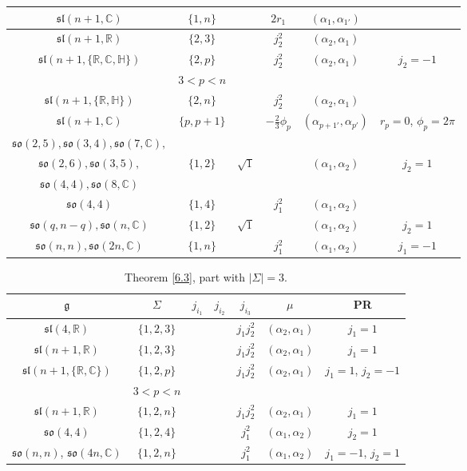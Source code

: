 \documentclass[pdftex]{sigma}
\newcommand{\Si}{\Sigma}
\newcommand{\fg}{\mathfrak g}
\newcommand{\R}{\mathbb{R}}
\newcommand{\C}{\mathbb{C}}
\numberwithin{equation}{section}
\begin{document}
\begin{table}[th!]
\begin{tabular}{|c|c|c|c|c|c|}
\hline
$\mathfrak{sl}(n+1,\mathbb{C})$ &$\{1,n\}$&& $2r_1$& $(\alpha_{1},\alpha_{1'})$& \\
\hline
$\mathfrak{sl}(n+1,\R)$ & $\{2,3\}$ &&$j_2^2$ & $(\alpha_2,\alpha_1)$ &\\
\hline
$\mathfrak{sl}(n+1,\{\R,\C,\mathbb{H}\})$ & $\{2,p\}$ &&$j_2^2$ & $(\alpha_2,\alpha_1)$ & $j_2=-1$\\
& $3<p<n$& & &&\\
\hline
$\mathfrak{sl}(n+1,\{\R,\mathbb{H}\})$ & $\{2,n\}$ &&$j_2^2$ & $(\alpha_2,\alpha_1)$ & \\
\hline
$\mathfrak{sl}(n+1,\mathbb{C})$& $\{p,p+1\}$ && $-\frac23\phi_p$& $ (\alpha_{p+1'},\alpha_{p'})$& $r_p=0$, $\phi_p=2\pi$ \\

\hline
$\mathfrak{so}(2,5),\mathfrak{so}(3,4),\mathfrak{so}(7,\C),$&&&& & \\
$\mathfrak{so}(2,6),\mathfrak{so}(3,5),$&$\{ 1,2\}$&$\sqrt{1} $&& $(\alpha_1,\alpha_2)$ &$j_2=1$ \\
$\mathfrak{so}(4,4),\mathfrak{so}(8,\C)$& & & & &\\
\hline
$\mathfrak{so}(4,4)$&$\{ 1,4\}$& & $j_1^2$& $(\alpha_1,\alpha_2)$ & \\
\hline
$\mathfrak{so}(q,n-q),\mathfrak{so}(n,\C)$&$\{ 1,2\}$&$\sqrt{1} $&& $(\alpha_1,\alpha_2)$ &$j_2=1$ \\
\hline
$\mathfrak{so}(n,n), \mathfrak{so}(2n,\C)$&$\{ 1,n\}$& & $j_1^2$& $(\alpha_1,\alpha_2)$ &$j_1=-1$ \\
\hline
\end{tabular}
\end{table}

\begin{table}[th!]\centering \caption{Theorem \ref{6.3}, part with $|\Si|=3$.}\label{ahs3}\vspace{1mm}

\begin{tabular}{|c|c|c|c|c|c|c|}
\hline
$\fg$ & $\Sigma$ & $j_{i_1}$& $j_{i_2}$& $j_{i_3}$&$\mu$&PR \\
\hline
\hline
$\mathfrak{sl}(4,\mathbb{R})$ &$\{1,2,3\}$& & & $j_1j_2^2 $ &$(\alpha_2,\alpha_1)$& $j_1=1$\\
\hline
$\mathfrak{sl}(n+1,\mathbb{R})$ &$\{1,2,3\}$& & & $j_1j_2^2 $ &$(\alpha_2,\alpha_1)$& $j_1=1$ \\
\hline
$\mathfrak{sl}(n+1,\{\mathbb{R},\C\})$ &$\{1,2,p\}$& & & $j_1j_2^2 $ &$(\alpha_2,\alpha_1)$& $j_1=1$, $j_2=-1$ \\
& $3<p<n$& & &&&\\
\hline
$\mathfrak{sl}(n+1,\mathbb{R})$ &$\{1,2,n\}$& & & $j_1j_2^2 $ &$(\alpha_2,\alpha_1)$& $j_1=1$ \\
\hline
$\mathfrak{so}(4,4)$& $\{1,2,4\}$&&& $j_1^2 $&$(\alpha_1,\alpha_2)$& $j_2=1$\\
\hline
$\mathfrak{so}(n,n)$, $\mathfrak{so}(4n,\mathbb{C})$& $\{1,2,n\}$&&& $j_1^2 $&$(\alpha_1,\alpha_2)$& $j_1=-1$, $j_2=1$\\
\hline
\end{tabular}
\end{table}
\end{document}
